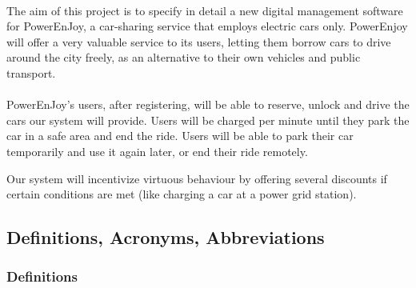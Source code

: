 \documentclass[english]{article}
\begin{document}
\paragraph{}
The aim of this project is to specify in detail a new digital management software for PowerEnJoy, a car-sharing service that employs electric cars only.
%
PowerEnjoy will offer a very valuable service to its users, letting them borrow cars to drive around the city freely, as an alternative to their own vehicles and public transport.

\paragraph{}
PowerEnJoy's users, after registering, will be able to reserve, unlock and drive the cars our system will provide. Users will be charged per minute until they park the car in a safe area and end the ride.
Users will be able to park their car temporarily and use it again later, or end their ride remotely.

Our system will incentivize virtuous behaviour by offering several discounts if certain conditions are met (like charging a car at a power grid station).


\newpage
\subsection{Definitions, Acronyms, Abbreviations}


\subsubsection{Definitions}
\end{document}
